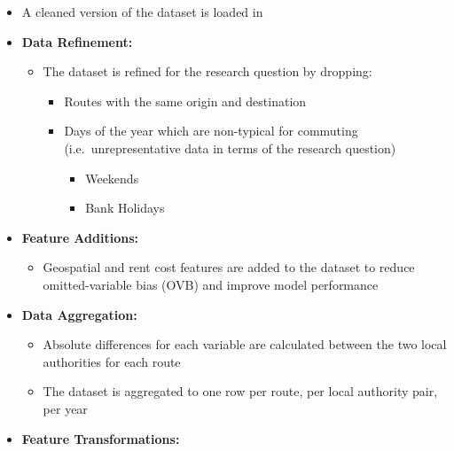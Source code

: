 \documentclass[
  number]{elsarticle}
\providecommand{\tightlist}{%
  \setlength{\itemsep}{0pt}\setlength{\parskip}{0pt}}
\begin{document}
\begin{tcolorbox}[enhanced jigsaw, colframe=quarto-callout-tip-color-frame, opacityback=0, breakable, toptitle=1mm, titlerule=0mm, coltitle=black, colback=white, bottomtitle=1mm, left=2mm, arc=.35mm, leftrule=.75mm, opacitybacktitle=0.6, bottomrule=.15mm, colbacktitle=quarto-callout-tip-color!10!white, title=\textcolor{quarto-callout-tip-color}{\faLightbulb}\hspace{0.5em}{Section Summary}, rightrule=.15mm, toprule=.15mm]

\begin{itemize}
\item
  A cleaned version of the dataset is loaded in
\item
  \textbf{Data Refinement:}

  \begin{itemize}
  \tightlist
  \item
    The dataset is refined for the research question by dropping:

    \begin{itemize}
    \tightlist
    \item
      Routes with the same origin and destination
    \item
      Days of the year which are non-typical for commuting
      (i.e.~unrepresentative data in terms of the research question)

      \begin{itemize}
      \tightlist
      \item
        Weekends
      \item
        Bank Holidays
      \end{itemize}
    \end{itemize}
  \end{itemize}
\item
  \textbf{Feature Additions:}

  \begin{itemize}
  \tightlist
  \item
    Geospatial and rent cost features are added to the dataset to reduce
    omitted-variable bias (OVB) and improve model performance
  \end{itemize}
\item
  \textbf{Data Aggregation:}

  \begin{itemize}
  \tightlist
  \item
    Absolute differences for each variable are calculated between the
    two local authorities for each route
  \item
    The dataset is aggregated to one row per route, per local authority
    pair, per year
  \end{itemize}
\item
  \textbf{Feature Transformations:}


\end{itemize}
\end{tcolorbox}
\end{document}
